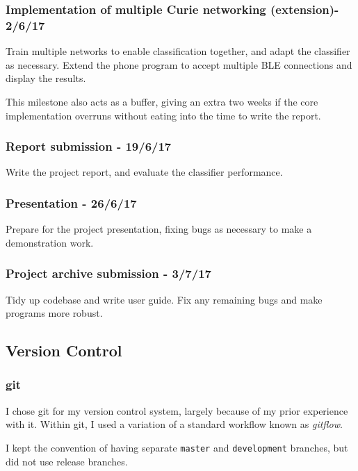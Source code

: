 \documentclass[a4paper]{article}
\begin{document}
\subsubsection{Implementation of multiple Curie networking (extension)- 2/6/17}

Train multiple networks to enable classification together, and adapt the classifier as necessary.
Extend the phone program to accept multiple BLE connections and display the results.

This milestone also acts as a buffer, giving an extra two weeks if the core implementation overruns without eating into the time to write the report.

\subsubsection{Report submission - 19/6/17}

Write the project report, and evaluate the classifier performance. 

\subsubsection{Presentation - 26/6/17}

Prepare for the project presentation, fixing bugs as necessary to make a demonstration work. 

\subsubsection{Project archive submission - 3/7/17}

Tidy up codebase and write user guide. Fix any remaining bugs and make programs more robust.

\normalsize
\subsection{Version Control}%
\label{subsec:pp_vc}

\subsubsection{git}

I chose git\cite{ppref0} for my version control system, largely because of my prior experience with it. Within git, I used a variation of a standard workflow known as \textit{gitflow}.\cite{ppref1} 

I kept the convention of having separate \lstinline{master} and \lstinline{development} branches, but did not use release branches. 
\end{document}
